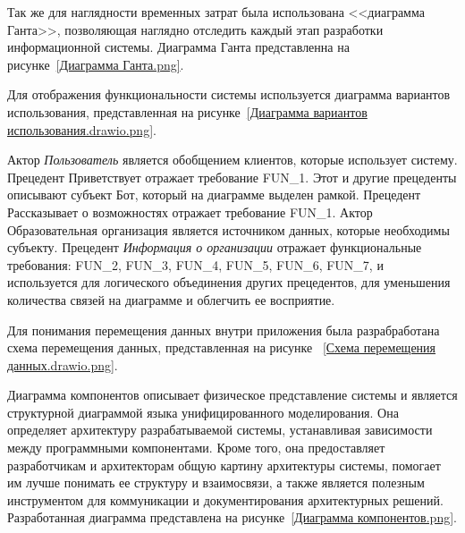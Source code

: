 
Так же для наглядности временных затрат была использована <<диаграмма Ганта>>,
позволяющая наглядно отследить каждый этап разработки информационной системы.
Диаграмма Ганта представленна на рисунке~\ref{Диаграмма Ганта.png}.


Для отображения функциональности системы используется диаграмма вариантов
использования, представленная на рисунке~\ref{Диаграмма вариантов использования.drawio.png}.

Актор \emph{Пользователь} является обобщением клиентов, которые использует 
систему. Прецедент Приветствует отражает требование FUN\_1. Этот и другие
прецеденты описывают субъект Бот, который на диаграмме выделен рамкой.
Прецедент Рассказывает о возможностях отражает требование FUN\_1.
Актор Образовательная организация является источником данных, которые 
необходимы субъекту. Прецедент \emph{Информация о организации} отражает
функциональные требования: FUN\_2, FUN\_3, FUN\_4, FUN\_5, FUN\_6, FUN\_7, и
используется для логического объединения других прецедентов, для уменьшения 
количества связей на диаграмме и облегчить ее восприятие.

Для понимания перемещения данных внутри приложения была разрабработана схема
перемещения данных, представленная на рисунке
~\ref{Схема перемещения данных.drawio.png}.


Диаграмма компонентов описывает физическое представление системы и является
структурной диаграммой языка унифицированного моделирования. Она определяет
архитектуру разрабатываемой системы, устанавливая зависимости между 
программными компонентами. Кроме того, она предоставляет разработчикам и
архитекторам общую картину архитектуры системы, помогает им лучше понимать ее
структуру и взаимосвязи, а также является полезным инструментом для
коммуникации и документирования архитектурных решений. Разработанная диаграмма
представлена на рисунке~\ref{Диаграмма компонентов.png}.



